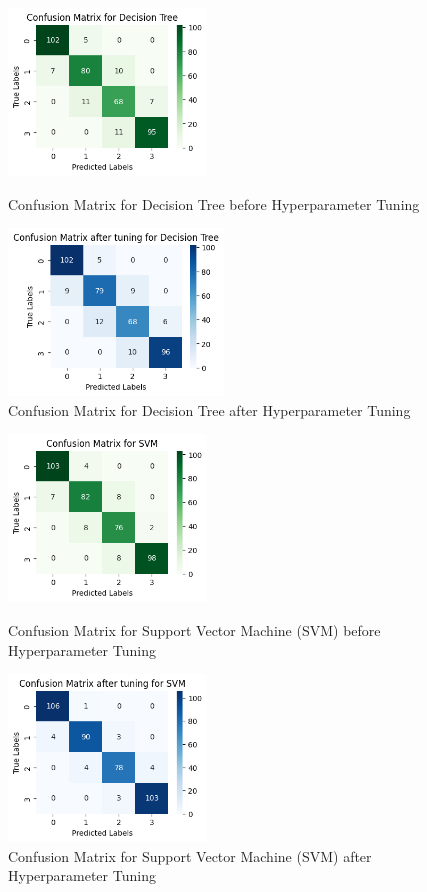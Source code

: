 \documentclass[12pt]{report}
\begin{document}
\begin{figure}[H]
    \centering
		\begin{minipage}{0.45\textwidth}
			\centering
			\includegraphics[height=12em]{cmat_DT.png}
			\caption{Confusion Matrix for Decision Tree before Hyperparameter Tuning}
			\label{cmat_DT}
		\end{minipage}
    \hfill
    \begin{minipage}{0.45\textwidth}
        \centering
        \includegraphics[height=12em]{cmat_tuned_DT.png}
        \caption{Confusion Matrix for Decision Tree after Hyperparameter Tuning}
        \label{cmat_tuned_DT}
    \end{minipage}
\end{figure}
\begin{figure}[H]
    \centering
		\begin{minipage}{0.45\textwidth}
			\centering
			\includegraphics[height=12em]{cmat_SVM.png}
			\caption{Confusion Matrix for Support Vector Machine (SVM) before Hyperparameter Tuning}
			\label{cmat_SVM}
		\end{minipage}
    \hfill
    \begin{minipage}{0.45\textwidth}
        \centering
        \includegraphics[height=12em]{cmat_tuned_SVM.png}
        \caption{Confusion Matrix for Support Vector Machine (SVM) after Hyperparameter Tuning}
        \label{cmat_tuned_SVM}
    \end{minipage}
\end{figure}
\end{document}
